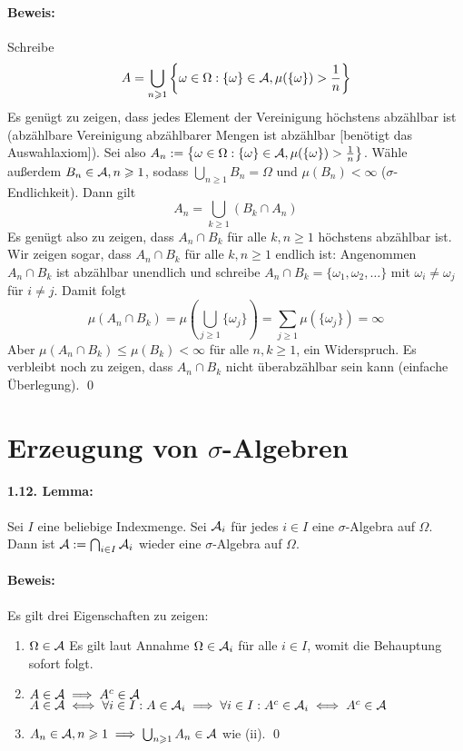 \documentclass[12pt]{report}
\begin{document}
\paragraph{Beweis:}Schreibe
$$A=\bigcup_{n\geqslant1}\left\{\omega\in\Omega:\{\omega\}\in\mathcal{A},\mu(\{\omega\})>\frac{1}{n}\right\}$$
Es gen\"ugt zu zeigen, dass jedes Element der Vereinigung h\"ochstens abz\"ahlbar ist (abz\"ahlbare Vereinigung abz\"ahlbarer Mengen ist abz\"ahlbar [ben\"otigt das Auswahlaxiom]). Sei also $A_n:=\left\{\omega\in\Omega:\{\omega\}\in\mathcal{A},\mu(\{\omega\})>\frac{1}{n}\right\}$. W\"ahle au\ss{}erdem $B_n\in\mathcal{A},n\geqslant1$, sodass $\bigcup_{n\geq1}B_n=\Omega$ und $\mu(B_n)<\infty$ ($\sigma$-Endlichkeit). Dann gilt
$$A_n=\bigcup_{k\geq1}(B_k\cap A_n)$$
Es gen\"ugt also zu zeigen, dass $A_n\cap B_k$ f\"ur alle $k,n\geq1$ h\"ochstens abz\"ahlbar ist. Wir zeigen sogar, dass $A_n\cap B_k$ f\"ur alle $k,n\geq1$ endlich ist:\newline
 Angenommen $A_n\cap B_k$ ist abz\"ahlbar unendlich und schreibe $A_n\cap B_k=\{\omega_1,\omega_2,\hdots\}$ mit $\omega_i\neq\omega_j$ f\"ur $i\neq j$. Damit folgt
 $$\mu(A_n\cap B_k)=\mu\left(\bigcup_{j\geq1}\{\omega_j\}\right)=\sum_{j\geq1}\mu(\{\omega_j\})=\infty$$
Aber $\mu(A_n\cap B_k)\leq\mu(B_k)<\infty$ f\"ur alle $n,k\geq1$, ein Widerspruch. Es verbleibt noch zu zeigen, dass $A_n\cap B_k$ nicht \"uberabz\"ahlbar sein kann (einfache \"Uberlegung). \qed

\section*{Erzeugung von $\sigma$-Algebren}
\paragraph{1.12. Lemma:}Sei $I$ eine beliebige Indexmenge. Sei $\mathcal{A}_i$ f\"ur jedes $i\in I$ eine $\sigma$-Algebra auf $\Omega$. Dann ist $\mathcal{A}:=\bigcap_{i\in I}\mathcal{A}_i$ wieder eine $\sigma$-Algebra auf $\Omega$.

\paragraph{Beweis:}Es gilt drei Eigenschaften zu zeigen:
\begin{enumerate}[label=(\roman*)]
    \item $\Omega\in\mathcal{A}$\newline
    Es gilt laut Annahme $\Omega\in\mathcal{A}_i$ f\"ur alle $i\in I$, womit die Behauptung sofort folgt.
    \item $A\in\mathcal{A}\implies A^c\in\mathcal{A}$\newline
    $A\in\mathcal{A}\iff\forall i\in I:A\in\mathcal{A}_i\implies\forall i\in I:A^c\in\mathcal{A}_i\iff A^c\in\mathcal{A}$
    \item $A_n\in\mathcal{A},n\geqslant1\implies\bigcup_{n\geqslant1}A_n\in\mathcal{A}$\newline
    wie (ii). \qed
\end{enumerate}
\end{document}
